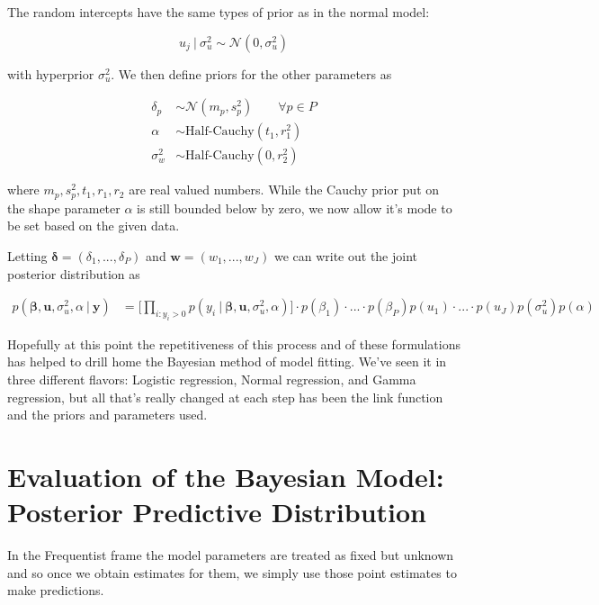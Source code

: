 \documentclass[12pt,twoside]{reedthesis}
\begin{document}
The random intercepts have the same types of prior as in the normal model:

\[
u_j \ | \ \sigma_u^2 \sim \mathcal{N}(0, \sigma_u^2)
\]

with hyperprior \(\sigma_u^2\). We then define priors for the other parameters as

\[
\begin{aligned}
\delta_p &\sim \mathcal{N}(m_p, s_p^2)  \qquad \forall p\in P \\
\alpha &\sim \text{Half-Cauchy}(t_1, r_1^2)\\
\sigma_w^2 &\sim \text{Half-Cauchy}(0, r_2^2)
\end{aligned}
\]

where \(m_p, s_p^2, t_1, r_1, r_2\) are real valued numbers. While the Cauchy prior put on the shape parameter \(\alpha\) is still bounded below by zero, we now allow it's mode to be set based on the given data.

Letting \(\boldsymbol{\delta} = (\delta_1, ..., \delta_P)\) and \(\mathbf{w} = (w_1, ..., w_J)\) we can write out the joint posterior distribution as

\[
\begin{aligned}
p(\boldsymbol{\beta}, \mathbf{u}, \sigma_u^2, \alpha \ | \ \mathbf{y}) &=\bigg[\prod_{i:y_{i} > 0}p(y_{i} \ | \ \boldsymbol{\beta},\mathbf{u}, \sigma_u^2, \alpha)\bigg]\cdot p(\beta_1)\cdot...\cdot p(\beta_P)p(u_1)\cdot ... \cdot p(u_J)p(\sigma_u^2)p( \alpha) 
\end{aligned}
\]

Hopefully at this point the repetitiveness of this process and of these formulations has helped to drill home the Bayesian method of model fitting. We've seen it in three different flavors: Logistic regression, Normal regression, and Gamma regression, but all that's really changed at each step has been the link function and the priors and parameters used.

\hypertarget{evaluation-of-the-bayesian-model-posterior-predictive-distribution}{%
\section{Evaluation of the Bayesian Model: Posterior Predictive Distribution}\label{evaluation-of-the-bayesian-model-posterior-predictive-distribution}}

In the Frequentist frame the model parameters are treated as fixed but unknown and so once we obtain estimates for them, we simply use those point estimates to make predictions.
\end{document}
